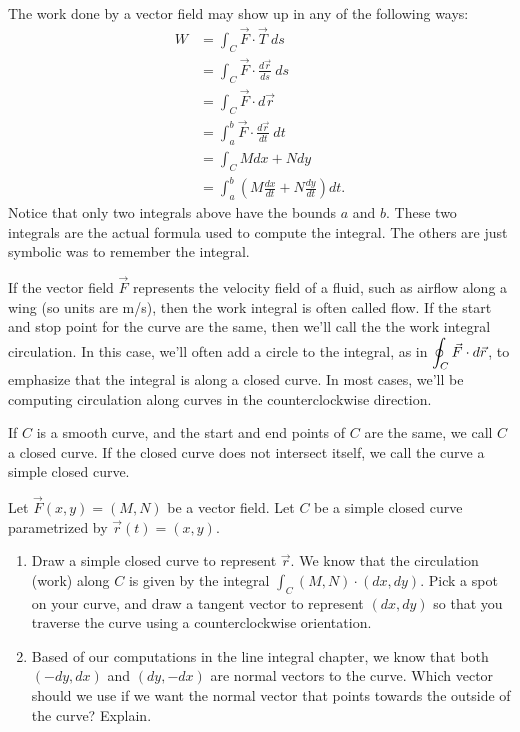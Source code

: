The work done by a vector field may show up in any of the following ways: 
\begin{align*}
W
&=\int_C \vec F\cdot \vec T \ ds\\
&=\int_C \vec F\cdot \frac{d\vec r}{ds}\ ds \\
&= \int_C\vec F\cdot d\vec r \\
&=\int_a^b \vec F\cdot \frac{d\vec r}{dt}\ dt \\
&= \int_C Mdx+Ndy \\
&= \int_a^b \left( M\frac{dx}{dt}+N\frac{dy}{dt}\right) dt. 
\end{align*}
Notice that only two integrals above have the bounds $a$ and $b$.  These two integrals are the actual formula used to compute the integral. The others are just symbolic was to remember the integral.

\begin{definition}
If the vector field $\vec F$ represents the velocity field of a fluid, such as airflow along a wing (so units are m/s), then the work integral is often called flow.  If the start and stop point for the curve are the same, then we'll call the the work integral circulation. In this case, we'll often add a circle to the integral, as in $\displaystyle\oint_C \vec F\cdot d\vec r$, to emphasize that the integral is along a closed curve.  In most cases, we'll be computing circulation along curves in the counterclockwise direction.
\end{definition}

\begin{definition}
 If $C$ is a smooth curve, and the start and end points of $C$ are the same, we call $C$ a closed curve.  If the closed curve does not intersect itself, we call the curve a simple closed curve.
\end{definition}


\begin{problem}
 Let $\vec F(x,y)=(M,N)$ be a vector field.  Let $C$ be a simple closed curve parametrized by $\vec r(t)=(x,y)$. 
\begin{enumerate}
 \item Draw a simple closed curve to represent $\vec r$.  We know that the circulation (work) along $C$ is given by the integral $\int_C (M,N)\cdot (dx,dy)$.  Pick a spot on your curve, and draw a tangent vector  to represent $(dx,dy)$ so that you traverse the curve using a counterclockwise orientation.
 \item Based of our computations in the line integral chapter, we know that both $(-dy,dx)$ and $(dy,-dx)$ are normal vectors to the curve.  Which vector should we use if we want the normal vector that points towards the outside of the curve? Explain. 
\end{enumerate}
\end{problem}

